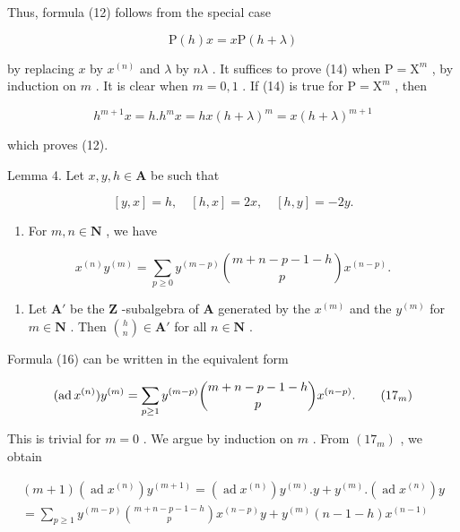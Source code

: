 Thus, formula (12) follows from the special case

\[
\mathrm{P} (h) x = x \mathrm{P} (h + \lambda)\tag{14}
\]

by replacing \(x\) by \(x^{(n)}\) and \(\lambda\) by \(n\lambda\) . It suffices to prove (14) when \(\mathrm{P} = \mathrm{X}^m\) , by induction on \(m\) . It is clear when \(m = 0, 1\) . If (14) is true for \(\mathrm{P} = \mathrm{X}^m\) , then

\[
h ^ {m + 1} x = h. h ^ {m} x = h x (h + \lambda) ^ {m} = x (h + \lambda) ^ {m + 1}
\]

which proves (12).

Lemma 4. Let \(x, y, h \in \mathbf{A}\) be such that

\[
[ y, x ] = h, \quad [ h, x ] = 2 x, \quad [ h, y ] = - 2 y.\tag{15}
\]

\begin{enumerate}
\def\labelenumi{(\roman{enumi})}
\tightlist
\item
  For \(m, n \in \mathbf{N}\) , we have
\end{enumerate}

\[
x ^ {(n)} y ^ {(m)} = \sum_ {p \geq 0} y ^ {(m - p)} \binom{m + n - p - 1 - h}{p} x ^ {(n - p)}.\tag{16}
\]

\begin{enumerate}
\def\labelenumi{(\roman{enumi})}
\setcounter{enumi}{1}
\tightlist
\item
  Let \(\mathbf{A}'\) be the \(\mathbf{Z}\) -subalgebra of \(\mathbf{A}\) generated by the \(x^{(m)}\) and the \(y^{(m)}\) for \(m \in \mathbf{N}\) . Then \(\binom{h}{n} \in \mathbf{A}'\) for all \(n \in \mathbf{N}\) .
\end{enumerate}

Formula (16) can be written in the equivalent form

\[
(\operatorname{ad} x ^ {(n)}) y ^ {(m)} = \sum_ {p \geq 1} y ^ {(m - p)} \binom {m + n - p - 1 - h} {p} x ^ {(n - p)}.\tag{$17_{m}$}
\]

This is trivial for \(m = 0\) . We argue by induction on \(m\) . From \((17_{m})\) , we obtain

\[
\begin{array}{l} (m + 1) (\operatorname{ad} x ^ {(n)}) y ^ {(m + 1)} = (\operatorname{ad} x ^ {(n)}) y ^ {(m)}. y + y ^ {(m)}. (\operatorname{ad} x ^ {(n)}) y \\ = \sum_ {p \geq 1} y ^ {(m - p)} \binom {m + n - p - 1 - h} {p} x ^ {(n - p)} y + y ^ {(m)} (n - 1 - h) x ^ {(n - 1)} \end{array} \tag {18}
\]

